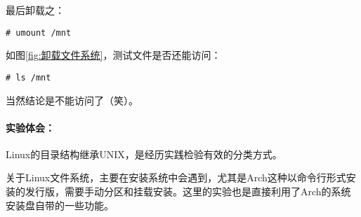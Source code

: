 \documentclass[cs4size,a4paper,nofonts]{ctexart}
\begin{document}
\begin{enumerate}
最后卸载之：
\begin{Verbatim}
# umount /mnt
\end{Verbatim}

如图\ref{fig:卸载文件系统}，测试文件是否还能访问：
\begin{Verbatim}
# ls /mnt
\end{Verbatim}
当然结论是不能访问了（笑）。

\begin{figure}[htp]
\end{figure}

\end{enumerate}

\paragraph{实验体会：}\quad

Linux的目录结构继承UNIX，是经历实践检验有效的分类方式。

关于Linux文件系统，主要在安装系统中会遇到，尤其是Arch这种以命令行形式安装的发行版，需要手动分区和挂载安装。这里的实验也是直接利用了Arch的系统安装盘自带的一些功能。
\end{document}

